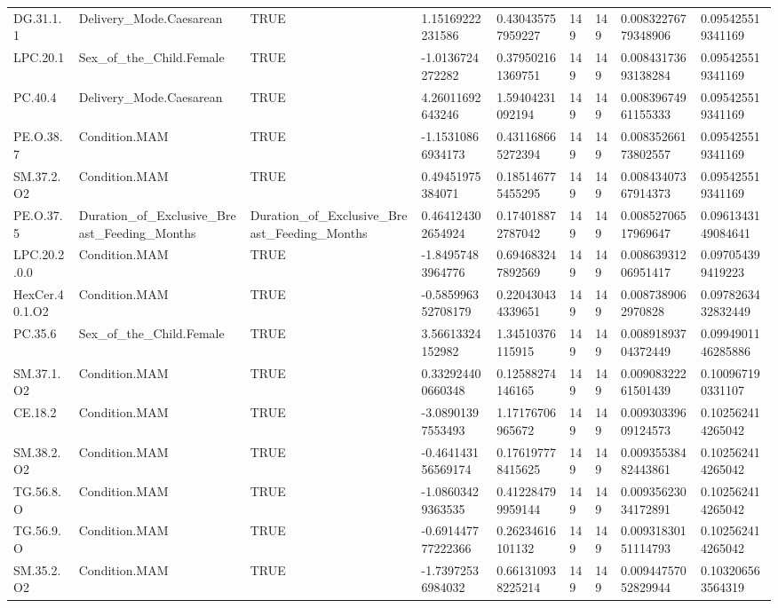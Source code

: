 \begin{longtable}{lllllllll}
DG.31.1.1 & Delivery\_Mode.Caesarean & TRUE & 1.15169222231586 & 0.430435757959227 & 149 & 149 & 0.00832276779348906 & 0.095425519341169 \\
LPC.20.1 & Sex\_of\_the\_Child.Female & TRUE & -1.0136724272282 & 0.379502161369751 & 149 & 149 & 0.00843173693138284 & 0.095425519341169 \\
PC.40.4 & Delivery\_Mode.Caesarean & TRUE & 4.26011692643246 & 1.59404231092194 & 149 & 149 & 0.00839674961155333 & 0.095425519341169 \\
PE.O.38.7 & Condition.MAM & TRUE & -1.15310866934173 & 0.431168665272394 & 149 & 149 & 0.00835266173802557 & 0.095425519341169 \\
SM.37.2.O2 & Condition.MAM & TRUE & 0.49451975384071 & 0.185146775455295 & 149 & 149 & 0.00843407367914373 & 0.095425519341169 \\
PE.O.37.5 & Duration\_of\_Exclusive\_Breast\_Feeding\_Months & Duration\_of\_Exclusive\_Breast\_Feeding\_Months & 0.464124302654924 & 0.174018872787042 & 149 & 149 & 0.00852706517969647 & 0.0961343149084641 \\
LPC.20.2.0.0 & Condition.MAM & TRUE & -1.84957483964776 & 0.694683247892569 & 149 & 149 & 0.00863931206951417 & 0.097054399419223 \\
HexCer.40.1.O2 & Condition.MAM & TRUE & -0.585996352708179 & 0.220430434339651 & 149 & 149 & 0.0087389062970828 & 0.0978263432832449 \\
PC.35.6 & Sex\_of\_the\_Child.Female & TRUE & 3.56613324152982 & 1.34510376115915 & 149 & 149 & 0.00891893704372449 & 0.0994901146285886 \\
SM.37.1.O2 & Condition.MAM & TRUE & 0.332924400660348 & 0.12588274146165 & 149 & 149 & 0.00908322261501439 & 0.100967190331107 \\
CE.18.2 & Condition.MAM & TRUE & -3.08901397553493 & 1.17176706965672 & 149 & 149 & 0.00930339609124573 & 0.102562414265042 \\
SM.38.2.O2 & Condition.MAM & TRUE & -0.464143156569174 & 0.176197778415625 & 149 & 149 & 0.00935538482443861 & 0.102562414265042 \\
TG.56.8.O & Condition.MAM & TRUE & -1.08603429363535 & 0.412284799959144 & 149 & 149 & 0.00935623034172891 & 0.102562414265042 \\
TG.56.9.O & Condition.MAM & TRUE & -0.691447777222366 & 0.26234616101132 & 149 & 149 & 0.00931830151114793 & 0.102562414265042 \\
SM.35.2.O2 & Condition.MAM & TRUE & -1.73972536984032 & 0.661310938225214 & 149 & 149 & 0.00944757052829944 & 0.103206563564319 \\

\end{longtable}
